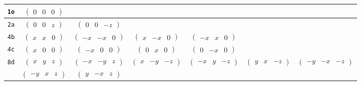 \documentclass[fleqn,9pt,landscape]{jsarticle}
\begin{document}
\begin{center}
\begin{longtable}{ccccccc}
{\tt 1o} & $ \begin{pmatrix} 0 & 0 & 0 \end{pmatrix} $ & $  $ & $  $ & $  $ & $  $ & $  $ \\ \hline
{\tt 2a} & $ \begin{pmatrix} 0 & 0 & z \end{pmatrix} $ & $ \begin{pmatrix} 0 & 0 & - z \end{pmatrix} $ & $  $ & $  $ & $  $ & $  $ \\ \hline
{\tt 4b} & $ \begin{pmatrix} x & x & 0 \end{pmatrix} $ & $ \begin{pmatrix} - x & - x & 0 \end{pmatrix} $ & $ \begin{pmatrix} x & - x & 0 \end{pmatrix} $ & $ \begin{pmatrix} - x & x & 0 \end{pmatrix} $ & $  $ & $  $ \\ \hline
{\tt 4c} & $ \begin{pmatrix} x & 0 & 0 \end{pmatrix} $ & $ \begin{pmatrix} - x & 0 & 0 \end{pmatrix} $ & $ \begin{pmatrix} 0 & x & 0 \end{pmatrix} $ & $ \begin{pmatrix} 0 & - x & 0 \end{pmatrix} $ & $  $ & $  $ \\ \hline
{\tt 8d} & $ \begin{pmatrix} x & y & z \end{pmatrix} $ & $ \begin{pmatrix} - x & - y & z \end{pmatrix} $ & $ \begin{pmatrix} x & - y & - z \end{pmatrix} $ & $ \begin{pmatrix} - x & y & - z \end{pmatrix} $ & $ \begin{pmatrix} y & x & - z \end{pmatrix} $ & $ \begin{pmatrix} - y & - x & - z \end{pmatrix} $ \\
& $ \begin{pmatrix} - y & x & z \end{pmatrix} $ & $ \begin{pmatrix} y & - x & z \end{pmatrix} $ & $  $ & $  $ & $  $ & $  $ \\
\end{longtable}
\end{center}
\end{document}
